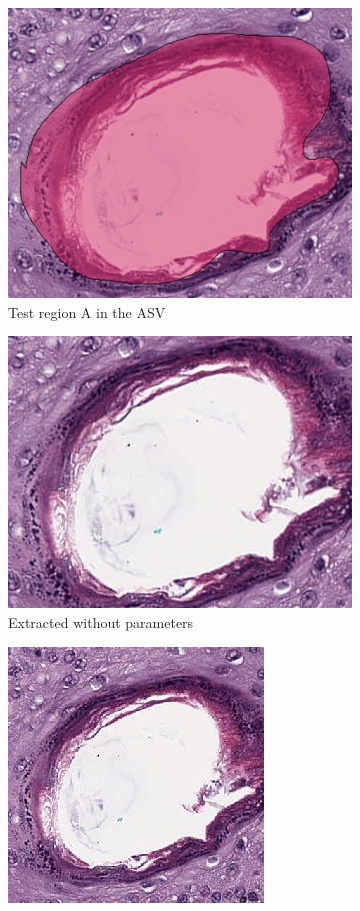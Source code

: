 \begin{figure}[H]
	\begin{subfigure}{.5\textwidth}
		\centering
		\includegraphics[width=.8\linewidth]{img/ts_test/region1.png}
		\caption{Test region A in the ASV}
	\end{subfigure}
	\begin{subfigure}{.5\textwidth}
		\centering
		\includegraphics[width=.8\linewidth]{img/ts_test/1_orig.jpeg}
		\caption{Extracted without parameters}
		\label{subfig5:a1}
	\end{subfigure}
	\begin{subfigure}{.5\textwidth}
		\centering
		\includegraphics[width=.8\linewidth]{img/ts_test/1_r256.jpeg}

\end{subfigure}
\end{figure}
